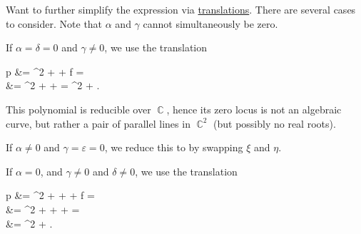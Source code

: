 \begin{algorithm}
  Want to further simplify the expression via \hyperref[def:rigid_motion/translation]{translations}. There are several cases to consider. Note that \( \alpha \) and \( \gamma \) cannot simultaneously be zero.

  \begin{thmenum}
     If \( \alpha = \delta = 0 \) and \( \gamma \neq 0 \), we use the translation
    \begin{balign*}
      p\parens*{ \xi, \eta - \frac \varepsilon {2 \gamma} }
      &=
      \gamma \parens*{ \eta - \frac \varepsilon {2 \gamma} }^2 + \varepsilon \parens*{ \eta - \frac \varepsilon {2 \gamma} } + f
      = \\ &=
      \gamma \eta^2 + \parens[\Big]{ 2 \gamma \cdot \frac {-\varepsilon} {2 \gamma} + \varepsilon } \eta + 
      =
      \gamma \eta^2 + .
    \end{balign*}

    This polynomial is reducible over \( \BbbC \), hence its zero locus is not an algebraic curve, but rather a pair of parallel lines in \( \BbbC^2 \) (but possibly no real roots).

     If \( \alpha \neq 0 \) and \( \gamma = \varepsilon = 0 \), we reduce this to  by swapping \( \xi \) and \( \eta \).

     If \( \alpha = 0 \), and \( \gamma \neq 0 \) and \( \delta \neq 0 \), we use the translation
    \begin{balign*}
      p
      &=
      \gamma \parens*{ \eta - \frac \varepsilon {2 \gamma} }^2 + \delta {} + \varepsilon \parens*{ \eta - \frac \varepsilon {2 \gamma} } + f
      = \\ &=
      \gamma \eta^2 + \delta {} + \parens[\Big]{ 2 \gamma \cdot \frac {-\varepsilon} {2 \gamma} + \varepsilon } \eta + 
      = \\ &=
      \gamma \eta^2 + \delta \xi.
    \end{balign*}


\end{thmenum}
\end{algorithm}
